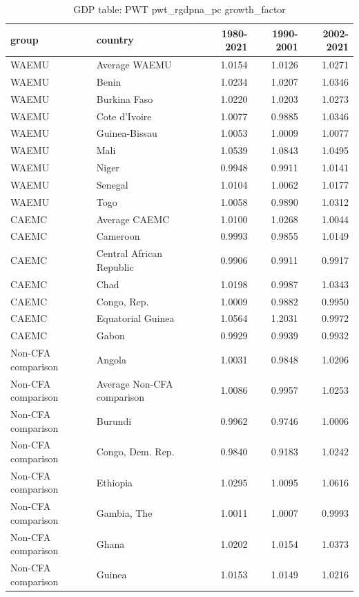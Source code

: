 \begin{table}

\caption{GDP table: PWT pwt_rgdpna_pc growth_factor}
\centering
\begin{tabular}[t]{llrrr}
\toprule
group & country & 1980-2021 & 1990-2001 & 2002-2021\\
\midrule
WAEMU & Average WAEMU & 1.0154 & 1.0126 & 1.0271\\
WAEMU & Benin & 1.0234 & 1.0207 & 1.0346\\
WAEMU & Burkina Faso & 1.0220 & 1.0203 & 1.0273\\
WAEMU & Cote d'Ivoire & 1.0077 & 0.9885 & 1.0346\\
WAEMU & Guinea-Bissau & 1.0053 & 1.0009 & 1.0077\\
\addlinespace
WAEMU & Mali & 1.0539 & 1.0843 & 1.0495\\
WAEMU & Niger & 0.9948 & 0.9911 & 1.0141\\
WAEMU & Senegal & 1.0104 & 1.0062 & 1.0177\\
WAEMU & Togo & 1.0058 & 0.9890 & 1.0312\\
CAEMC & Average CAEMC & 1.0100 & 1.0268 & 1.0044\\
\addlinespace
CAEMC & Cameroon & 0.9993 & 0.9855 & 1.0149\\
CAEMC & Central African Republic & 0.9906 & 0.9911 & 0.9917\\
CAEMC & Chad & 1.0198 & 0.9987 & 1.0343\\
CAEMC & Congo, Rep. & 1.0009 & 0.9882 & 0.9950\\
CAEMC & Equatorial Guinea & 1.0564 & 1.2031 & 0.9972\\
\addlinespace
CAEMC & Gabon & 0.9929 & 0.9939 & 0.9932\\
Non-CFA comparison & Angola & 1.0031 & 0.9848 & 1.0206\\
Non-CFA comparison & Average Non-CFA comparison & 1.0086 & 0.9957 & 1.0253\\
Non-CFA comparison & Burundi & 0.9962 & 0.9746 & 1.0006\\
Non-CFA comparison & Congo, Dem. Rep. & 0.9840 & 0.9183 & 1.0242\\
\addlinespace
Non-CFA comparison & Ethiopia & 1.0295 & 1.0095 & 1.0616\\
Non-CFA comparison & Gambia, The & 1.0011 & 1.0007 & 0.9993\\
Non-CFA comparison & Ghana & 1.0202 & 1.0154 & 1.0373\\
Non-CFA comparison & Guinea & 1.0153 & 1.0149 & 1.0216\\

\end{tabular}
\end{table}
